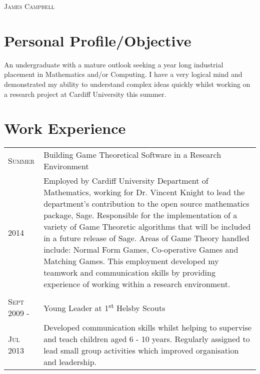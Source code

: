 \documentclass[a4paper, 11pt]{article}
\begin{document}
\pagestyle{empty} %
\begin{multicols}{2}

\raggedright{\textsc{\Huge{James Campbell}}}\\
\columnbreak
{}

\end{multicols}
\section{Personal Profile/Objective}
An undergraduate with a mature outlook seeking a year long industrial placement in Mathematics and/or Computing. I have a very logical mind and demonstrated my ability to understand complex ideas quickly whilst working on a research project at Cardiff University this summer.

\section{Work Experience}
\begin{tabularx}{\textwidth}{lX}

\textsc{Summer} & Building Game Theoretical Software in a Research Environment \\
\textsc{2014}& \footnotesize{Employed by Cardiff University Department of Mathematics, working for Dr. Vincent Knight to lead the department's contribution to the open source mathematics package, Sage. Responsible for the implementation of a variety of Game Theoretic algorithms that will be included in a future release of Sage. Areas of Game Theory handled include: Normal Form Games, Co-operative Games and Matching Games. This employment developed my teamwork and communication skills by providing experience of working within a research environment.}\\
\\
\textsc{Sept 2009 -} & Young Leader at 1\textsuperscript{st} Helsby Scouts\\
\textsc{Jul 2013}& \footnotesize{Developed communication skills whilst helping to supervise and teach children aged 6 - 10 years. Regularly assigned to lead small group activities which improved organisation and leadership.}\\

\end{tabularx}
\end{document}

